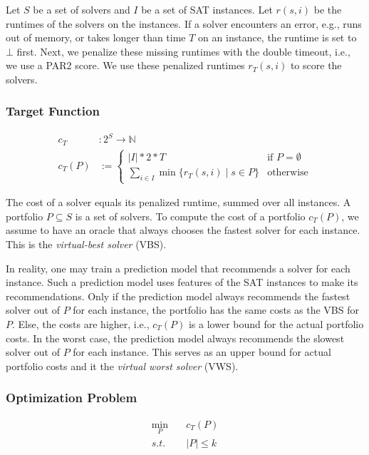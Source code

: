 \documentclass[conference]{IEEEtran}
\begin{document}
Let $S$ be a set of solvers and $I$ be a set of SAT instances.
Let $r(s,i)$ be the runtimes of the solvers on the instances.
If a solver encounters an error, e.g., runs out of memory, or takes longer than time $T$ on an instance, the runtime is set to $\bot$ first.
Next, we penalize these missing runtimes with the double timeout, i.e., we use a PAR2 score.
We use these penalized runtimes $r_T(s,i)$ to score the solvers.

\subsubsection{Target Function}
\label{sec:approach:problem:target}

\begin{align*}
	c_{T} &: 2^S \rightarrow \mathbb{N}\\
	c_{T}(P) &:= \begin{cases}
		|I|*2*T & \text{if }P=\emptyset\\
		\sum_{i \in I}{\min\{r_T(s,i) \mid s \in P\}} & \text{otherwise}
	\end{cases} \tag*{Portfolio Cost}
\end{align*}

The cost of a solver equals its penalized runtime, summed over all instances.
A portfolio $P \subseteq S$ is a set of solvers.
To compute the cost of a portfolio $c_{T}(P)$, we assume to have an oracle that always chooses the fastest solver for each instance.
This is the \emph{virtual-best solver} (VBS).

In reality, one may train a prediction model that recommends a solver for each instance.
Such a prediction model uses features of the SAT instances to make its recommendations.
Only if the prediction model always recommends the fastest solver out of $P$ for each instance, the portfolio has the same costs as the VBS for $P$.
Else, the costs are higher, i.e., $c_{T}(P)$ is a lower bound for the actual portfolio costs.
In the worst case, the prediction model always recommends the slowest solver out of $P$ for each instance.
This serves as an upper bound for actual portfolio costs and it the \emph{virtual worst solver} (VWS).

\subsubsection{Optimization Problem}

\begin{equation}
	\label{eq:small-portfolio-problem}
	\begin{aligned}
		\min_P \quad & c_{T}(P)\\
		s.t. \quad & |P| \leq k
	\end{aligned}
   \tag{Small-Portfolio Problem}
\end{equation}
\end{document}
